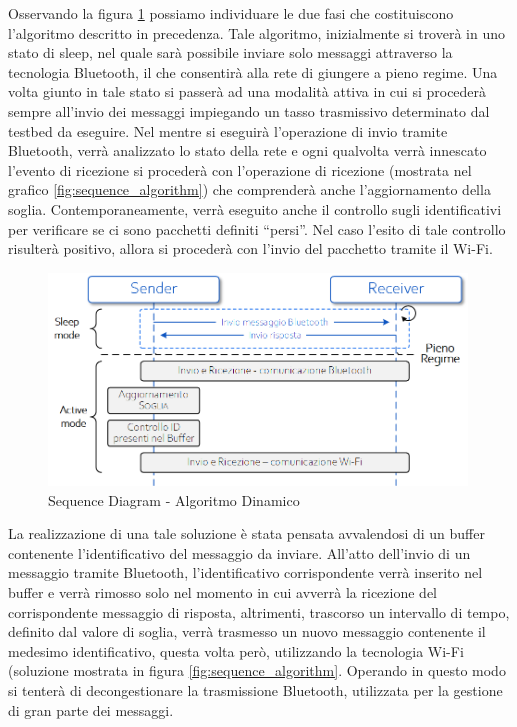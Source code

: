 \noindent Osservando la figura \ref{fig:sequence_algorithm_2} possiamo individuare le due fasi che costituiscono l'algoritmo descritto in precedenza. Tale algoritmo, inizialmente si troverà in uno stato di sleep, nel quale sarà possibile inviare solo messaggi attraverso la tecnologia Bluetooth, il che consentirà alla rete di giungere a pieno regime. Una volta giunto in tale stato si passerà ad una modalità attiva in cui si procederà sempre all'invio dei messaggi impiegando un tasso trasmissivo determinato dal testbed da eseguire. Nel mentre si eseguirà l'operazione di invio tramite Bluetooth, verrà analizzato lo stato della rete e ogni qualvolta verrà innescato l'evento di ricezione si procederà con l'operazione di ricezione (mostrata nel grafico \ref{fig:sequence_algorithm}) che comprenderà anche l'aggiornamento della soglia. Contemporaneamente, verrà eseguito anche il controllo sugli identificativi per verificare se ci sono pacchetti definiti ``persi''. Nel caso l'esito di tale controllo risulterà positivo, allora si procederà con l'invio del pacchetto tramite il Wi-Fi.

\begin{figure}[!ht]
    \centering
    \includegraphics[width = 0.99\textwidth]{images/algoritmo_sequence_2.png}
    \caption{Sequence Diagram - Algoritmo Dinamico}
    \label{fig:sequence_algorithm_2}
\end{figure}

\noindent La realizzazione di una tale soluzione è stata pensata avvalendosi di un buffer contenente l'identificativo del messaggio da inviare. All'atto dell'invio di un messaggio tramite Bluetooth, l'identificativo corrispondente verrà inserito nel buffer e verrà rimosso solo nel momento in cui avverrà la ricezione del corrispondente messaggio di risposta, altrimenti, trascorso un intervallo di tempo, definito dal valore di soglia, verrà trasmesso un nuovo messaggio contenente il medesimo identificativo, questa volta però, utilizzando la tecnologia Wi-Fi (soluzione mostrata in figura \ref{fig:sequence_algorithm}. 
Operando in questo modo si tenterà di decongestionare la trasmissione Bluetooth, utilizzata per la gestione di gran parte dei messaggi.  

